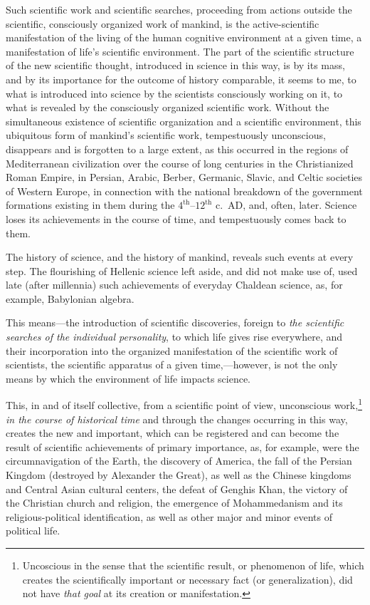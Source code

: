 Such scientific work and scientific searches, proceeding from actions outside
the scientific, consciously organized work of mankind, is the active-scientific
manifestation of the living of the human cognitive environment at a given time,
a manifestation of life's scientific environment.  The part of the scientific
structure of the new scientific thought, introduced in science in this way, is
by its mass, and by its importance for the outcome of history comparable, it
seems to me, to what is introduced into science by the scientists consciously
working on it, to what is revealed by the consciously organized scientific
work.  Without the simultaneous existence of scientific organization and a
scientific environment, this ubiquitous form of mankind's scientific work,
tempestuously unconscious, disappears and is forgotten to a large extent, as
this occurred in the regions of Mediterranean civilization over the course of
long centuries in the Christianized Roman Empire, in Persian, Arabic, Berber,
Germanic, Slavic, and Celtic societies of Western Europe, in connection with
the national breakdown of the government formations existing in them during the
$4^\mathrm{th}$--$12^\mathrm{th}$ c.\ AD, and, often, later.  Science loses its
achievements in the course of time, and tempestuously comes back to them.

The history of science, and the history of mankind, reveals such events at
every step.  The flourishing of Hellenic science left aside, and did not make
use of, used late (after millennia) such achievements of everyday Chaldean
science, as, for example, Babylonian algebra.


\Section %
This means---the introduction of scientific discoveries, foreign to \emph{the
scientific searches of the individual personality}, to which life gives rise
everywhere, and their incorporation into the organized manifestation of the
scientific work of scientists, the scientific apparatus of a given
time,---however, is not the only means by which the environment of life impacts
science.

This, in and of itself collective,  from a scientific point
of view, unconscious work,\footnote{%
	Uncoscious in the sense that the scientific result, or phenomenon of
	life, which creates the scientifically important or necessary fact (or
	generalization), did not have \emph{that goal} at its creation or
	manifestation.
} \emph{in the course of historical time} and through the
changes occurring in this way, creates the new and important, which can be
registered and can become the result of scientific achievements of primary
importance, as, for example, were the circumnavigation of the Earth, the
discovery of America, the fall of the Persian Kingdom (destroyed by Alexander
the Great), as well as the Chinese kingdoms and Central Asian cultural centers,
the defeat of Genghis Khan, the victory of the Christian church and religion,
the emergence of Mohammedanism and its religious-political identification, as
well as other major and minor events of political life.

